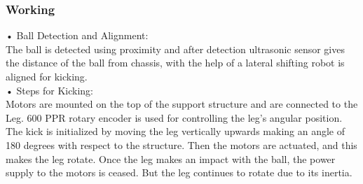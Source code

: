 
        \subsubsection{Working}       
            •  Ball Detection and Alignment:                                                                                                        \\
            The ball is detected using proximity and after detection ultrasonic sensor gives the distance of the ball from chassis,
            with the help of a lateral shifting robot is aligned for kicking.                                                                       \\
            •  Steps for Kicking:                                                                                                                   \\
            Motors are mounted on the top of the support structure and are connected to the Leg. 600 PPR rotary encoder is
            used for controlling the leg’s angular position. The kick is initialized by moving the leg vertically upwards making
            an angle of 180 degrees with respect to the structure. Then the motors are actuated, and this makes the leg rotate.
            Once the leg makes an impact with the ball, the power supply to the motors is ceased. But the leg continues to rotate
            due to its inertia.                                                                                                                     \\   

